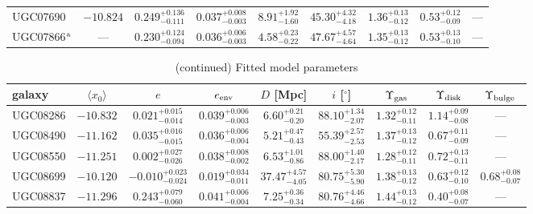 \documentclass[twocolumn,tighten]{aastex63}
\begin{document}
\begin{table}
\begin{center}
\begin{tabular}{lcccccccc}
   UGC07690 & $ -10.824 $ & $ 0.249 _{ -0.111 } ^{ + 0.136 } $ & $ 0.037 _{ -0.003 } ^{ + 0.008 } $ & $ 8.91 _{ -1.60 } ^{ + 1.92 } $ & $ 45.30 _{ -4.18 } ^{ + 4.32 } $ & $ 1.36 _{ -0.12 } ^{ + 0.13 } $ & $ 0.53 _{ -0.09 } ^{ + 0.12 } $ & --- \\  
   UGC07866$^{\rm a}$ &  ---  & $ 0.230 _{ -0.094 } ^{ + 0.124 } $ & $ 0.036 _{ -0.003 } ^{ + 0.006 } $ & $ 4.58 _{ -0.22 } ^{ + 0.23 } $ & $ 47.67 _{ -4.64 } ^{ + 4.57 } $ & $ 1.35 _{ -0.12 } ^{ + 0.13 } $ & $ 0.53 _{ -0.10 } ^{ + 0.13 } $ & --- \\  
 \hline
\end{tabular}
\end{center}
\end{table}

\newpage

\setcounter{table}{1}
\begin{table}
\caption{(continued) Fitted model parameters}
\begin{center}
  \begin{tabular}{lcccccccc} \hline
 galaxy  & $\langle x_0\rangle$  & $e$  & $e_{\rm env}$ & $D$ [Mpc]  & $i$ [$^\circ$] & $\Upsilon_{\rm gas}$ & $\Upsilon_{\rm disk}$  & $\Upsilon_{\rm bulge}$  \\
 \hline
   UGC08286 & $ -10.832 $ & $ 0.021 _{ -0.014 } ^{ + 0.015 } $ & $ 0.039 _{ -0.003 } ^{ + 0.006 } $ & $ 6.60 _{ -0.20 } ^{ + 0.21 } $ & $ 88.10 _{ -2.07 } ^{ + 1.34 } $ & $ 1.32 _{ -0.11 } ^{ + 0.12 } $ & $ 1.14 _{ -0.08 } ^{ + 0.09 } $ & --- \\  
   UGC08490 & $ -11.162 $ & $ 0.035 _{ -0.015 } ^{ + 0.016 } $ & $ 0.036 _{ -0.004 } ^{ + 0.006 } $ & $ 5.21 _{ -0.43 } ^{ + 0.47 } $ & $ 55.39 _{ -2.53 } ^{ + 2.57 } $ & $ 1.37 _{ -0.12 } ^{ + 0.13 } $ & $ 0.67 _{ -0.09 } ^{ + 0.11 } $ & --- \\  
   UGC08550 & $ -11.251 $ & $ 0.002 _{ -0.026 } ^{ + 0.027 } $ & $ 0.038 _{ -0.002 } ^{ + 0.008 } $ & $ 6.53 _{ -0.86 } ^{ + 1.01 } $ & $ 88.00 _{ -2.17 } ^{ + 1.40 } $ & $ 1.28 _{ -0.11 } ^{ + 0.12 } $ & $ 0.72 _{ -0.11 } ^{ + 0.13 } $ & --- \\  
   UGC08699 & $ -10.120  $ & $ -0.010 _{ -0.024 } ^{ + 0.023 } $ & $ 0.019 _{ -0.011 } ^{ + 0.034 } $ & $ 37.47 _{ -4.05 } ^{ + 4.57 } $ & $ 80.75 _{ -5.90 } ^{ + 5.30 } $ & $ 1.38 _{ -0.12 } ^{ + 0.13 } $ & $ 0.63 _{ -0.10 } ^{ + 0.12 } $ & $ 0.68 _{ -0.07 } ^{ + 0.08 } $  \\  
   UGC08837 & $ -11.296 $ & $ 0.243 _{ -0.060 } ^{ + 0.079 } $ & $ 0.041 _{ -0.004 } ^{ + 0.006 } $ & $ 7.25 _{ -0.34 } ^{ + 0.36 } $ & $ 80.76 _{ -4.66 } ^{ + 4.46 } $ & $ 1.44 _{ -0.12 } ^{ + 0.13 } $ & $ 0.40 _{ -0.07 } ^{ + 0.08 } $ & --- \\  

\end{tabular}
\end{center}
\end{table}
\end{document}
